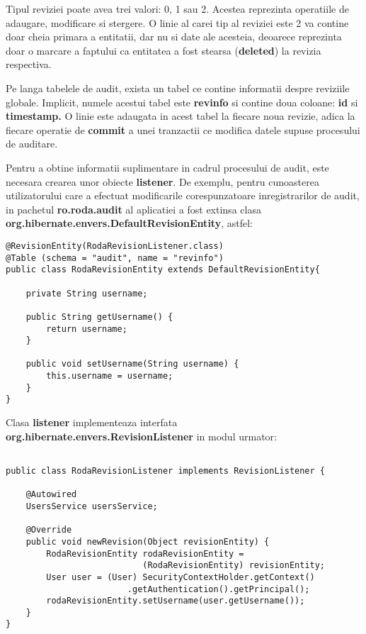 Tipul reviziei poate avea trei valori: 0, 1 sau 2. Acestea reprezinta operatiile de adaugare, modificare si stergere. 
O linie al carei tip al reviziei este 2 va contine doar cheia primara a entitatii, dar nu si date ale acesteia, 
deoarece reprezinta doar o marcare a faptului ca entitatea a fost stearsa (\textbf{deleted}) la revizia respectiva.

\bigskip

Pe langa tabelele de audit, exista un tabel ce contine informatii despre reviziile globale. 
Implicit, numele acestui tabel este \textbf{revinfo} si contine doua coloane: \textbf{id} si \textbf{timestamp. }
O linie este adaugata in acest tabel la fiecare noua revizie, adica la fiecare operatie de \textbf{commit} a unei tranzactii ce modifica datele supuse procesului de auditare.

\bigskip

Pentru a obtine informatii suplimentare in cadrul procesului de audit, este necesara crearea unor obiecte \textbf{listener}. 
De exemplu, pentru cunoasterea utilizatorului care a efectuat modificarile corespunzatoare inregistrarilor de audit, in pachetul \textbf{ro.roda.audit}
 al aplicatiei a fost extinsa clasa \textbf{org.hibernate.envers.DefaultRevisionEntity}, astfel:

\bigskip

\begin{lstlisting}[breaklines=true]
@RevisionEntity(RodaRevisionListener.class)
@Table (schema = "audit", name = "revinfo")
public class RodaRevisionEntity extends DefaultRevisionEntity{

	private String username;

	public String getUsername() {
		return username;
	}

	public void setUsername(String username) {
		this.username = username;
	}
}

\end{lstlisting}
Clasa \textbf{listener} implementeaza interfata \textbf{org.hibernate.envers.RevisionListener} in modul urmator:

\begin{lstlisting}[breaklines=true]

public class RodaRevisionListener implements RevisionListener {

	@Autowired
	UsersService usersService;

	@Override
	public void newRevision(Object revisionEntity) {
		RodaRevisionEntity rodaRevisionEntity = 
                           (RodaRevisionEntity) revisionEntity;
		User user = (User) SecurityContextHolder.getContext()
                        .getAuthentication().getPrincipal();
		rodaRevisionEntity.setUsername(user.getUsername());
	}
}
\end{lstlisting}
